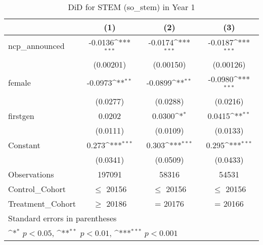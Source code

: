 \begin{table}[htbp]\centering
\def\sym#1{\ifmmode^{#1}\else\(^{#1}\)\fi}
\caption{DiD for STEM (so\_stem) in Year 1}
\begin{tabular}{l*{3}{c}}
\toprule
                &\multicolumn{1}{c}{(1)}         &\multicolumn{1}{c}{(2)}         &\multicolumn{1}{c}{(3)}         \\
\midrule
ncp\_announced   &  -0.0136\sym{***}&  -0.0174\sym{***}&  -0.0187\sym{***}\\
                &(0.00201)         &(0.00150)         &(0.00126)         \\
\addlinespace
female          &  -0.0973\sym{**} &  -0.0899\sym{**} &  -0.0980\sym{***}\\
                & (0.0277)         & (0.0288)         & (0.0216)         \\
\addlinespace
firstgen        &   0.0202         &   0.0300\sym{*}  &   0.0415\sym{**} \\
                & (0.0111)         & (0.0109)         & (0.0133)         \\
\addlinespace
Constant        &    0.273\sym{***}&    0.303\sym{***}&    0.295\sym{***}\\
                & (0.0341)         & (0.0509)         & (0.0433)         \\
\midrule
Observations    &   197091         &    58316         &    54531         \\
Control\_Cohort  &$\le$ 20156         &$\le$ 20156         &$\le$ 20156         \\
Treatment\_Cohort&$\ge$ 20186         &  = 20176         &  = 20166         \\
\bottomrule
\multicolumn{4}{l}{\footnotesize Standard errors in parentheses}\\
\multicolumn{4}{l}{\footnotesize \sym{*} \(p<0.05\), \sym{**} \(p<0.01\), \sym{***} \(p<0.001\)}\\
\end{tabular}
\end{table}
